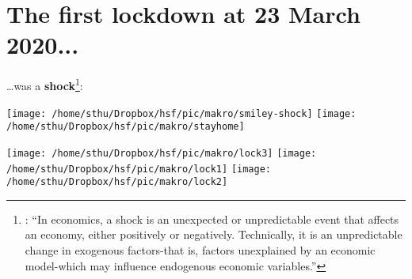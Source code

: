 


\section{The first lockdown at 23 March 2020...}

\dots was a \textbf{shock}\footnote{\citet[][Entry: Shock (economics)]{Wikipedia2022}:
		``In economics, a shock is an unexpected or unpredictable event that affects an economy, either positively or negatively. Technically, it is an unpredictable change in exogenous factors-that is, factors unexplained by an economic model-which may influence endogenous economic variables.''
}:


\begin{center}
\texttt{[image: /home/sthu/Dropbox/hsf/pic/makro/smiley-shock]}
\texttt{[image: /home/sthu/Dropbox/hsf/pic/makro/stayhome]}
\end{center}

\texttt{[image: /home/sthu/Dropbox/hsf/pic/makro/lock3]}
\texttt{[image: /home/sthu/Dropbox/hsf/pic/makro/lock1]}
\texttt{[image: /home/sthu/Dropbox/hsf/pic/makro/lock2]}




{}



